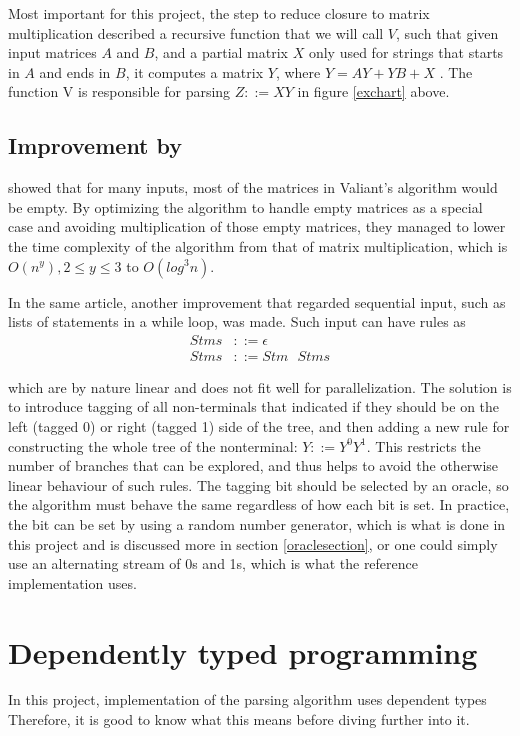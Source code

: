 \documentclass[a4paper,12pt,notitlepage]{report}
\renewcommand\cite{\citep}
\begin{document}
Most important for this project, the step to reduce closure to matrix
multiplication described a recursive function that we will call $V$, such that
given input matrices $A$ and $B$, and a partial matrix $X$ only used for strings
that starts in $A$ and ends in $B$, it computes a matrix $Y$, where $Y = AY + YB
+ X$ \cite{parparsepaper}. The function V is responsible for parsing $Z ::= XY$
in figure \ref{exchart} above.

\subsection{Improvement by \citeauthor{parparsepaper}}
\citet{parparsepaper} showed that for many inputs, most of the matrices
in Valiant's algorithm would be empty. By optimizing the algorithm to handle
empty matrices as a special case and avoiding multiplication of those empty
matrices, they managed to lower the time complexity of the algorithm from that
of matrix multiplication, which is $O(n^y), 2 \leq y \leq 3$ to $O(log^3 n)$. 

In the same article, another improvement that regarded sequential input, such as
lists of statements in a while loop, was made. Such input can have rules as
\begin{align*}
Stms &::= \epsilon \\
Stms &::= Stm\text{ }Stms
\end{align*}

which are by nature linear and does not fit well for parallelization. The
solution is to introduce tagging of all non-terminals that indicated if they
should be on the left (tagged 0) or right (tagged 1) side of the tree, and then
adding a new rule for constructing the whole tree of the nonterminal: $Y ::=
Y^0Y^1$. This restricts the number of branches that can be explored, and thus
helps to avoid the otherwise linear behaviour of such rules. The tagging bit
should be selected by an oracle, so the algorithm must behave the same
regardless of how each bit is set. In practice, the bit can be set by using a
random number generator, which is what is done in this project and is discussed
more in section \ref{oraclesection}, or one could simply use an alternating
stream of 0s and 1s, which is what the reference implementation uses. 

\section{Dependently typed programming}
In this project, implementation of the parsing algorithm uses dependent types
Therefore, it is good to know what this means before diving further into it.
\end{document}

